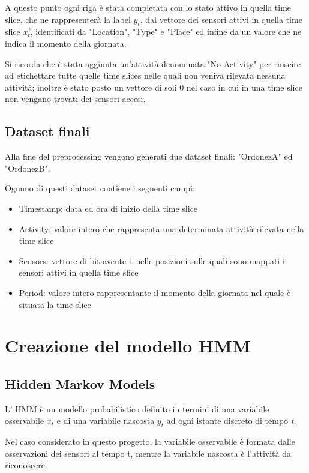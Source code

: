 \documentclass[10pt,a4paper]{article}
\begin{document}
	A questo punto ogni riga è stata completata con lo stato attivo in quella time slice, che ne rappresenterà la label $ y_{t} $, dal vettore dei sensori attivi in quella time slice $  \vec{x_{t}} $, identificati da "Location", "Type" e "Place" ed infine da un valore che ne indica il momento della giornata.
	
	Si ricorda che è stata aggiunta un'attività denominata "No Activity" per riuscire ad etichettare tutte quelle time slices nelle quali non veniva rilevata nessuna attività; inoltre è stato posto un vettore di soli 0 nel caso in cui in una time slice non vengano trovati dei sensori accesi.
	
	\subsection{Dataset finali}
	Alla fine del preprocessing vengono generati due dataset finali: "OrdonezA" ed "OrdonezB".
	
	Ognuno di questi dataset contiene i seguenti campi:
	
	\begin{itemize}
		\item Timestamp: data ed ora di inizio della time slice
		\item Activity: valore intero che rappresenta una determinata attività rilevata nella time slice
		\item Sensors: vettore di bit avente 1 nelle posizioni sulle quali sono mappati i sensori attivi in quella time slice
		\item Period: valore intero rappresentante il momento della giornata nel quale è situata la time slice
	\end{itemize}
	\clearpage
	
	\section{Creazione del modello HMM}
	
	\subsection{Hidden Markov Models}
	L' HMM è un modello probabilistico definito in termini di una variabile osservabile $ x_{t} $ e di una variabile nascosta $ y_{t} $ ad ogni istante discreto di tempo \textit{t}.
	
	Nel caso considerato in questo progetto, la variabile osservabile è formata dalle osservazioni dei sensori al tempo t, mentre la variabile nascosta è l'attività da riconoscere.
	
\end{document}
